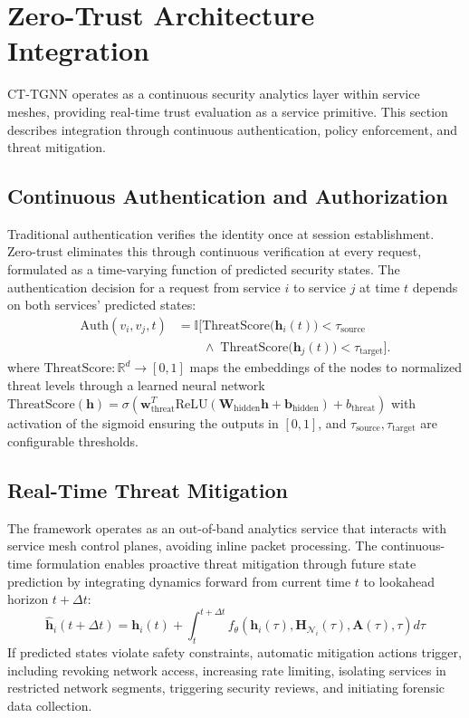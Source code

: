 \documentclass[lettersize,journal]{IEEEtran}
\newcommand{\R}{\mathbb{R}}
\begin{document}
\section{Zero-Trust Architecture Integration}
\label{sec:zerotrust}

CT-TGNN operates as a continuous security analytics layer within service meshes, providing real-time trust evaluation as a service primitive. This section describes integration through continuous authentication, policy enforcement, and threat mitigation.

\subsection{Continuous Authentication and Authorization}

Traditional authentication verifies the identity once at session establishment. Zero-trust eliminates this through continuous verification at every request, formulated as a time-varying function of predicted security states. The authentication decision for a request from service $i$ to service $j$ at time $t$ depends on both services' predicted states:
\begin{equation}
\begin{aligned}
\mathrm{Auth}(v_i,v_j,t)
&=\mathbb{I}\Big[
\mathrm{ThreatScore}\!\big(\mathbf{h}_i(t)\big)<\tau_{\mathrm{source}}
\\[-2pt]
&\qquad\land\;
\mathrm{ThreatScore}\!\big(\mathbf{h}_j(t)\big)<\tau_{\mathrm{target}}
\Big].
\end{aligned}
\end{equation}
where $\text{ThreatScore} : \R^d \rightarrow [0,1]$ maps the embeddings of the nodes to normalized threat levels through a learned neural network $\text{ThreatScore}(\mathbf{h}) = \sigma(\mathbf{w}_{\text{threat}}^T \text{ReLU}(\mathbf{W}_{\text{hidden}} \mathbf{h} + \mathbf{b}_{\text{hidden}}) + b_{\text{threat}})$ with activation of the sigmoid ensuring the outputs in $[0,1]$, and $\tau_{\text{source}}, \tau_{\text{target}}$ are configurable thresholds.

\subsection{Real-Time Threat Mitigation}

The framework operates as an out-of-band analytics service that interacts with service mesh control planes, avoiding inline packet processing. The continuous-time formulation enables proactive threat mitigation through future state prediction by integrating dynamics forward from current time $t$ to lookahead horizon $t + \Delta t$:
\begin{equation}
\hat{\mathbf{h}}_i(t + \Delta t) = \mathbf{h}_i(t) + \int_t^{t+\Delta t} f_\theta(\mathbf{h}_i(\tau), \mathbf{H}_{\mathcal{N}_i}(\tau), \mathbf{A}(\tau), \tau) d\tau
\end{equation}
If predicted states violate safety constraints, automatic mitigation actions trigger, including revoking network access, increasing rate limiting, isolating services in restricted network segments, triggering security reviews, and initiating forensic data collection.
\end{document}
